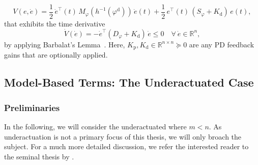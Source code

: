 \begin{equation}
    V(e, \dot{e}) = \frac{1}{2} \, \dot{e}^\top(t) \, M_\varphi(h^{-1}(\varphi^\mathrm{d})) \, \dot{e}(t) + \frac{1}{2} \, e^\top(t) \, \left ( S_\varphi + K_\mathrm{d} \right ) \, e(t),
\end{equation}
that exhibits the time derivative
\begin{equation}
    \dot{V}(\dot{e}) = -\dot{e}^\top \left (D_\varphi + K_\mathrm{d} \right ) \, \dot{e} \leq 0 \quad \forall \: \dot{e} \in \mathbb{R}^n,
\end{equation}
by applying Barbalat's Lemma~\citep{slotine1991applied, della2020model}.
Here, $K_\mathrm{p}, K_\mathrm{d} \in \mathbb{R}^{n \times n} \succeq 0$ are any PD feedback gains that are optionally applied.


\subsection{Model-Based Terms: The Underactuated Case}\label{sub:background:model_based_control:model_based_terms_underactuated}

\subsubsection{Preliminaries}

In the following, we will consider the underactuated where $m < n$. As underactuation is not a primary focus of this thesis, we will only broach the subject. For a much more detailed discussion, we refer the interested reader to the seminal thesis by \citet{pustina2025analysis}.

